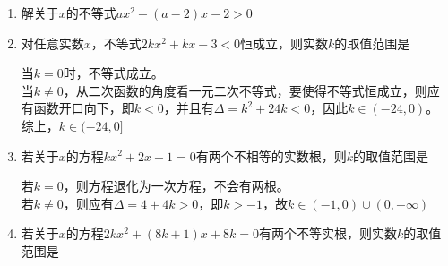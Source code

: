 \begin{enumerate}
\begin{enumerate}
        \item 解关于$x$的不等式$ax^2-(a-2)x-2 > 0$
        \begin{jieda}
        \end{jieda}
        \item 对任意实数$x$，不等式$2kx^2+kx-3<0$恒成立，则实数$k$的取值范围是\blkda{$(-24, 0]$}
        \begin{jieda}
            当$k=0$时，不等式成立。\\
            当$k \neq 0$，从二次函数的角度看一元二次不等式，要使得不等式恒成立，则应有函数开口向下，即$k<0$，并且有$\Delta = k^2 + 24k < 0$，因此$k \in (-24, 0)$。\\
            综上，$k \in (-24, 0]$
        \end{jieda}
         \item 若关于$x$的方程$kx^2+2x-1 = 0$有两个不相等的实数根，则$k$的取值范围是
        \begin{jieda}
            若$k = 0$，则方程退化为一次方程，不会有两根。\\
            若$k \neq 0$，则应有$\Delta = 4+4k > 0$，即$k > -1$，故$k \in (-1, 0) \cup (0, +\infty)$
        \end{jieda}
        \item 若关于$x$的方程$2kx^2+(8k+1)x+8k = 0$有两个不等实根，则实数$k$的取值范围是

\end{enumerate}
\end{enumerate}
